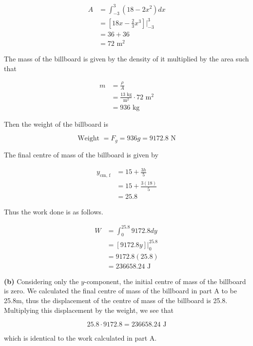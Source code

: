 \documentclass{article}
\begin{document}
    \begin{align*}
        A   &= \int_{-3}^3 (18-2x^2)dx \\
            &= \left[18x-\frac{2}{3}x^3\right]\Big|_{-3}^3 \\
            &= 36 + 36 \\
            &= 72 \text{ m}^2
    \end{align*}

    The mass of the billboard is given by the density of it multiplied by the area such that

    \begin{align*}
        m   &= \frac{\rho}{A} \\
            &= \frac{13\text{ kg}}{\text{m}^2}\cdot 72 \text{ m}^2 \\
            &= 936 \text{ kg}
    \end{align*}

    Then the weight of the billboard is

    \[
        \text{Weight } = F_g = 936g = 9172.8\text{ N}
    \]

    The final centre of mass of the billboard is given by

    \begin{align*}
        y_{\text{cm, f}}    &= 15 + \frac{3h}{5} \\
                            &= 15 + \frac{3(18)}{5} \\
                            &= 25.8
    \end{align*}

    \pagebreak
    \thispagestyle{4}

    Thus the work done is as follows.

    \begin{align*}
        W   &= \int_0^{25.8} 9172.8dy \\
            &= \left[9172.8y\right]\Big|_0^{25.8} \\
            &= 9172.8(25.8) \\
            &= 236658.24 \text{ J}
    \end{align*}

    \textbf{(b)}
    Considering only the $y$-component, the initial centre of mass of the billboard is zero. We calculated the final centre of mass of the billboard in part A to be 25.8m, thus the displacement of the centre of mass of
    the billboard is 25.8. Multiplying this displacement by the weight, we see that

    \[
        25.8 \cdot 9172.8 = 236658.24 \text{ J}
    \]

    which is identical to the work calculated in part A.
\end{document}
